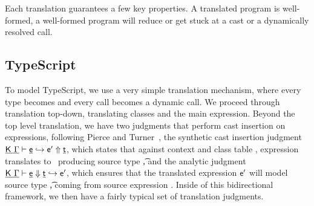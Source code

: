 \documentclass[a4paper,USenglish]{tex/lipics-v2016}
\begin{document}
\noindent
Each translation guarantees a few key properties. A translated program is
well-formed, a well-formed program will reduce or get stuck at a cast or a
dynamically resolved call.



\subsection{TypeScript}

To model TypeScript, we use a very simple translation mechanism, where every
type becomes \any and every call becomes a dynamic call.  We proceed through
translation top-down, translating classes and the main expression.  Beyond
the top level translation, we have two judgments that perform cast insertion
on expressions, following Pierce and Turner~\cite{pierce:1998:local}, the
synthetic cast insertion judgment $\GenCast\K\Env\e\ep\t$, which states that
against context \Env and class table \src\K, expression \src\e\,translates to
\ep\, producing source type \src\t, and the analytic judgment
$\AnaCast\K\Env\e\ep\t$, which ensures that the translated expression ${{{\sf{e'}}}}$
will model source type \src\t, coming from source expression \src\e.  Inside
of this bidirectional framework, we then have a fairly typical set of
translation judgments.
\end{document}
